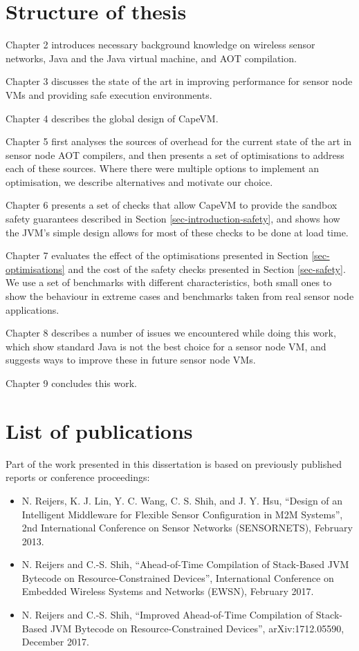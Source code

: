 \section{Structure of thesis}
Chapter 2 introduces necessary background knowledge on wireless sensor networks, Java and the Java virtual machine, and AOT compilation.

Chapter 3 discusses the state of the art in improving performance for sensor node VMs and providing safe execution environments.

Chapter 4 describes the global design of CapeVM.

Chapter 5 first analyses the sources of overhead for the current state of the art in sensor node AOT compilers, and then presents a set of optimisations to address each of these sources. Where there were multiple options to implement an optimisation, we describe alternatives and motivate our choice.

Chapter 6 presents a set of checks that allow CapeVM to provide the sandbox safety guarantees described in Section \ref{sec-introduction-safety}, and shows how the JVM's simple design allows for most of these checks to be done at load time.

Chapter 7 evaluates the effect of the optimisations presented in Section \ref{sec-optimisations} and the cost of the safety checks presented in Section \ref{sec-safety}. We use a set of benchmarks with different characteristics, both small ones to show the behaviour in extreme cases and benchmarks taken from real sensor node applications.

Chapter 8 describes a number of issues we encountered while doing this work, which show standard Java is not the best choice for a sensor node VM, and suggests ways to improve these in future sensor node VMs.

Chapter 9 concludes this work.

\section{List of publications}
Part of the work presented in this dissertation is based on previously published reports or conference proceedings:

\begin{itemize}
    \item N. Reijers, K. J. Lin, Y. C. Wang, C. S. Shih, and J. Y. Hsu, “Design of an Intelligent Middleware for Flexible Sensor Configuration in M2M Systems”, 2nd International Conference on Sensor Networks (SENSORNETS), February 2013.
    \item N. Reijers and C.-S. Shih, “Ahead-of-Time Compilation of Stack-Based JVM Bytecode on Resource-Constrained Devices”, International Conference on Embedded Wireless Systems and Networks (EWSN), February 2017.
    \item N. Reijers and C.-S. Shih, “Improved Ahead-of-Time Compilation of Stack-Based JVM Bytecode on Resource-Constrained Devices”, arXiv:1712.05590, December 2017.
\end{itemize}

